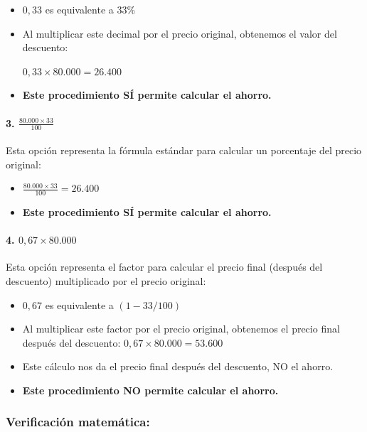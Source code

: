 \documentclass[
]{article}
\providecommand{\tightlist}{%
  \setlength{\itemsep}{0pt}\setlength{\parskip}{0pt}}
\begin{document}
\begin{itemize}
\item
  \(0,33\) es equivalente a 33\%
\item
  Al multiplicar este decimal por el precio original, obtenemos el valor
  del descuento:

  \(0,33 \times 80.000 = 26.400\)
\item
  \textbf{Este procedimiento SÍ permite calcular el ahorro.}
\end{itemize}

\paragraph{\texorpdfstring{3.
\(\frac{80.000 \times 33}{100}\)}{3. \textbackslash frac\{80.000 \textbackslash times 33\}\{100\}}}\label{frac80.000-times-33100}

Esta opción representa la fórmula estándar para calcular un porcentaje
del precio original:

\begin{itemize}
\tightlist
\item
  \(\frac{80.000 \times 33}{100} = 26.400\)
\item
  \textbf{Este procedimiento SÍ permite calcular el ahorro.}
\end{itemize}

\paragraph{\texorpdfstring{4.
\(0,67 \times 80.000\)}{4. 0,67 \textbackslash times 80.000}}\label{times-80.000-1}

Esta opción representa el factor para calcular el precio final (después
del descuento) multiplicado por el precio original:

\begin{itemize}
\tightlist
\item
  \(0,67\) es equivalente a \((1 - 33/100)\)
\item
  Al multiplicar este factor por el precio original, obtenemos el precio
  final después del descuento: \(0,67 \times 80.000 = 53.600\)
\item
  Este cálculo nos da el precio final después del descuento, NO el
  ahorro.
\item
  \textbf{Este procedimiento NO permite calcular el ahorro.}
\end{itemize}

\subsubsection{Verificación
matemática:}\label{verificaciuxf3n-matemuxe1tica}
\end{document}
